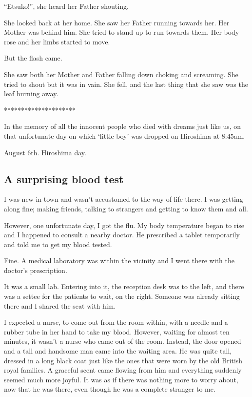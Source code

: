 \documentclass[twoside,11pt,titlepage]{article}
\begin{document}
``Etsuko!'', she heard her Father shouting.

She looked back at her home. She saw her Father running towards her. Her Mother was behind him. She tried to stand up to run towards them. Her body rose and her limbs started to move.

But the flash came.

She saw both her Mother and Father falling down choking and screaming. She tried to shout but it was in vain. She fell, and the last thing that she saw was the leaf burning away.

\bigskip
\begin{center}
*********************
\end{center}

 In the memory of all the innocent people who died with dreams just like us, on that unfortunate day on which `little boy' was dropped on Hiroshima at 8:45am.

 August 6th. Hiroshima day.
\newpage

\begin{center}
  \section{A surprising blood test}
\end{center}
\bigskip
\bigskip
\bigskip

I was new in town and wasn't accustomed to the way of life there. I was getting along fine; making friends, talking to strangers and getting to know them and all.

However, one unfortunate day, I got the flu. My body temperature began to rise and I happened to consult a nearby doctor. He prescribed a tablet temporarily and told me to get my blood tested.

Fine. A medical laboratory was within the vicinity and I went there with the doctor's prescription.

It was a small lab. Entering into it, the reception desk was to the left, and there was a settee for the patients to wait, on the right. Someone was already sitting there and I shared the seat with him.

I expected a nurse, to come out from the room within, with a needle and a rubber tube in her hand to take my blood. However, waiting for almost ten minutes, it wasn't a nurse who came out of the room. Instead, the door opened and a tall and handsome man came into the waiting area. He was quite tall, dressed in a long black coat just like the ones that were worn by the old British royal families. A graceful scent came flowing from him and everything suddenly seemed much more joyful. It was as if there was nothing more to worry about, now that he was there, even though he was a complete stranger to me.
\end{document}
